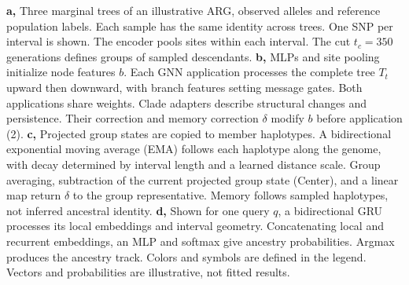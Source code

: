 \caption{\textbf{a,} Three marginal trees of an illustrative ARG, observed alleles and reference population labels. Each sample has the same identity across trees. One SNP per interval is shown. The encoder pools sites within each interval. The cut $t_c=350$ generations defines groups of sampled descendants.
\textbf{b,} MLPs and site pooling initialize node features $b$. Each GNN application processes the complete tree $T_t$ upward then downward, with branch features setting message gates. Both applications share weights. Clade adapters describe structural changes and persistence. Their correction and memory correction $\delta$ modify $b$ before application (2).
\textbf{c,} Projected group states are copied to member haplotypes. A bidirectional exponential moving average (EMA) follows each haplotype along the genome, with decay determined by interval length and a learned distance scale. Group averaging, subtraction of the current projected group state (Center), and a linear map return $\delta$ to the group representative. Memory follows sampled haplotypes, not inferred ancestral identity.
\textbf{d,} Shown for one query $q$, a bidirectional GRU processes its local embeddings and interval geometry. Concatenating local and recurrent embeddings, an MLP and softmax give ancestry probabilities. Argmax produces the ancestry track. Colors and symbols are defined in the legend. Vectors and probabilities are illustrative, not fitted results.}
